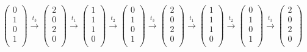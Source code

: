 \documentclass[a4paper,12pt]{scrartcl}
\begin{document}
\subsubsection{}
\begin{math}
  \begin{pmatrix}
  0\\
  1\\
  0\\
  1\\
  \end{pmatrix}
  \xrightarrow{t_3}
  \begin{pmatrix}
  2\\
  0\\
  2\\
  0\\
  \end{pmatrix}
  \xrightarrow{t_1}
  \begin{pmatrix}
  1\\
  1\\
  1\\
  0\\
  \end{pmatrix}
  \xrightarrow{t_2}
  \begin{pmatrix}
  0\\
  1\\
  0\\
  1\\
  \end{pmatrix}
  \xrightarrow{t_3}
  \begin{pmatrix}
  2\\
  0\\
  2\\
  0\\
  \end{pmatrix}
  \xrightarrow{t_1}
  \begin{pmatrix}
  1\\
  1\\
  1\\
  0\\
  \end{pmatrix}
  \xrightarrow{t_2}
  \begin{pmatrix}
  0\\
  1\\
  0\\
  1\\
  \end{pmatrix}
  \xrightarrow{t_3}
  \begin{pmatrix}
  2\\
  0\\
  2\\
  0\\
  \end{pmatrix}
\end{math}
\end{document}

